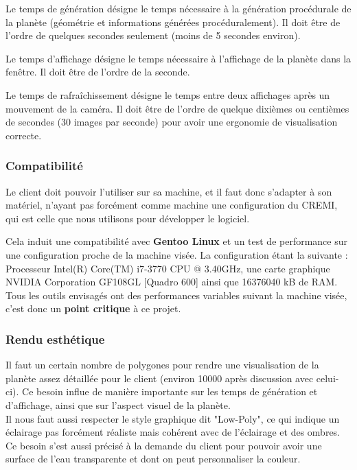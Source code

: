\documentclass[a4paper]{article}
\begin{document}
Le temps de génération désigne le temps nécessaire à la génération procédurale de la planète (géométrie et informations générées procéduralement). Il doit être de l'ordre de quelques secondes seulement (moins de 5 secondes environ).
         
Le temps d'affichage désigne le temps nécessaire à l'affichage de la planète dans la fenêtre. Il doit être de l'ordre de la seconde.
         
Le temps de rafraîchissement désigne le temps entre deux affichages après un mouvement de la caméra. Il doit être de l'ordre de quelque dixièmes ou centièmes de secondes (30 images par seconde) pour avoir une ergonomie de visualisation correcte.
        
\subsubsection{Compatibilité} \label{Compatibilité}
        
Le client doit pouvoir l'utiliser sur sa machine, et il faut donc s'adapter à son matériel, n'ayant pas forcément comme machine une configuration du CREMI, qui est celle que nous utilisons pour développer le logiciel.
        
Cela induit une compatibilité avec \textbf{Gentoo Linux} et un test de performance sur une configuration proche de la machine visée. La configuration étant la suivante : Processeur Intel(R) Core(TM) i7-3770 CPU @ 3.40GHz, une carte graphique NVIDIA Corporation GF108GL [Quadro 600] ainsi que 16376040 kB de RAM. Tous les outils envisagés ont des performances variables suivant la machine visée, c'est donc un \textbf{point critique} à ce projet.
        
\subsubsection{Rendu esthétique}
        
Il faut un certain nombre de polygones pour rendre une visualisation de la planète assez détaillée pour le client (environ 10000 après discussion avec celui-ci). Ce besoin influe de manière importante sur les temps de génération et d'affichage, ainsi que sur l'aspect visuel de la planète.\\
Il nous faut aussi respecter le style graphique dit "Low-Poly", ce qui indique un éclairage pas forcément réaliste mais cohérent avec de l'éclairage et des ombres.
Ce besoin s'est aussi précisé à la demande du client pour pouvoir avoir une surface de l'eau transparente et dont on peut personnaliser la couleur.
\end{document}
